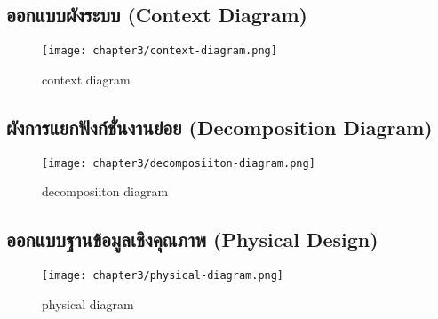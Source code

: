 \subsection{ออกแบบผังระบบ (Context Diagram)}
  \begin{figure}[!h]
    \centering
    \texttt{[image: chapter3/context-diagram.png]}  
    \caption{context diagram}
    \label{Fig:context_diagram}
  \end{figure}

\subsection{ผังการแยกฟังก์ชั่นงานย่อย (Decomposition Diagram)}
  \begin{figure}[!h]
    \centering
    \texttt{[image: chapter3/decomposiiton-diagram.png]}  
    \caption{decomposiiton diagram}
    \label{Fig:decomposiiton_diagram}
  \end{figure}
  \newpage

\subsection{ออกแบบฐานข้อมูลเชิงคุณภาพ (Physical Design)}
\begin{figure}[!h]
  \centering
  \texttt{[image: chapter3/physical-diagram.png]}  
  \caption{physical diagram}
  \label{Fig:physical_diagram}
\end{figure}






